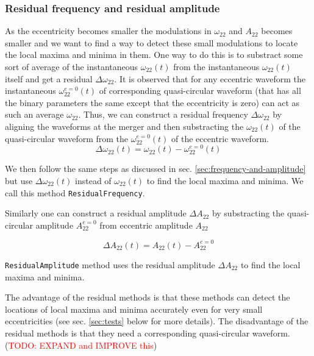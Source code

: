 \documentclass[aps,prd,amsmath,floats,floatfix, twocolumn,
superscriptaddress,nofootinbib,showpacs]{revtex4-1}
\newcommand{\red}{\textcolor{red}}
\newcommand{\TODO}[1]{\red{TODO: #1}}
\begin{document}
\subsubsection{Residual frequency and residual amplitude}
\label{sec:residual-frequency-and-residual-amplitude}
As the eccentricity becomes smaller the modulations in $\omega_{22}$
and $A_{22}$ becomes smaller and we want to find a way to detect these
small modulations to locate the local maxima and minima in them. One
way to do this is to substract some sort of average of the
instantaneous $\omega_{22}(t)$ from the instantaneous $\omega_{22}(t)$
itself and get a residual $\Delta\omega_{22}$. It is observed that for
any eccentric waveform the instantaneous $\omega_{22}^{e=0}(t)$ of
corresponding quasi-circular waveform (that has all the binary
parameters the same except that the eccentricity is zero) can act as
such an average $\omega_{22}$. Thus, we can construct a residual
frequency $\Delta\omega_{22}$ by aligning the waveforms at the merger
and then substracting the $\omega_{22}(t)$ of the quasi-circular
waveform from the $\omega_{22}^{e=0}(t)$ of the eccentric waveform.
\begin{equation}
  \label{eq:residual-omega22}
  \Delta\omega_{22}(t) = \omega_{22}(t) - \omega_{22}^{e=0}(t)
\end{equation}

We then follow the same steps as discussed in
sec. \ref{sec:frequency-and-amplitude} but use $\Delta\omega_{22}(t)$
instead of $\omega_{22}(t)$ to find the local maxima and minima. We
call this method \texttt{ResidualFrequency}.

Similarly one can construct a residual amplitude $\Delta A_{22}$ by
substracting the quasi-circular amplitude $A_{22}^{e=0}$ from
eccentric amplitude $A_{22}$

\begin{equation}
  \label{eq:residual-amplitude}
  \Delta A_{22}(t) = A_{22}(t) - A_{22}^{e=0}
\end{equation}

\texttt{ResidualAmplitude} method uses the residual amplitude $\Delta
A_{22}$ to find the local maxima and minima.

The advantage of the residual methods is that these methods can detect
the locations of local maxima and minima accurately even for very
small eccentricities (see sec. \ref{sec:tests} below for more
details). The disadvantage of the residual methods is that they need a
corresponding quasi-circular waveform. (\TODO{EXPAND and IMPROVE this})
\end{document}
